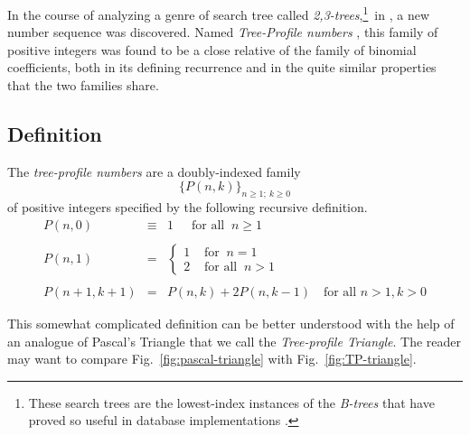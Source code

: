 

In the course of analyzing a genre of search tree called {\it
  2,3-trees},\footnote{These search trees are the lowest-index
  instances of the {\it B-trees} that have proved so useful in database
  implementations \cite{CLRS}.}~in \cite{MillerPRS79,RosenbergS78}, a
new number sequence was discovered.
Named {\it Tree-Profile numbers} \cite{Rosenberg79}, this family of
positive integers was found to be a close relative of the family of
binomial coefficients, both in its defining recurrence and in the
quite similar properties that the two families share.

\subsection{Definition}

The {\it tree-profile numbers} are a doubly-indexed family
\[ \big\{ P(n,k) \big\}_{n \geq 1; \ k \geq 0}  \]
of positive integers specified by the following recursive definition.
\begin{equation}
\label{eq:TP-defn}
\begin{array}{ccl}
P(n,0) & \equiv & 1 \ \ \ \ \ \mbox{ for all } \ n \geq 1 \\
  & & \\
P(n,1) & = &
  {\displaystyle
\left\{
\begin{array}{cl}
 1 & \mbox{ for } \ n=1 \\
 2 & \mbox{ for all } \ n > 1
\end{array}
\right.  } \\
  & & \\
P(n+1, k+1) & = & P(n,k) + 2 P(n, k-1) \ \ \  \mbox{ for all } n > 1, k > 0
\end{array}
\end{equation}

This somewhat complicated definition can be better understood with the
help of an analogue of Pascal's Triangle that we call the {\it
  Tree-profile Triangle}.  The reader may want to compare
Fig.~\ref{fig:pascal-triangle} with Fig.~\ref{fig:TP-triangle}.

